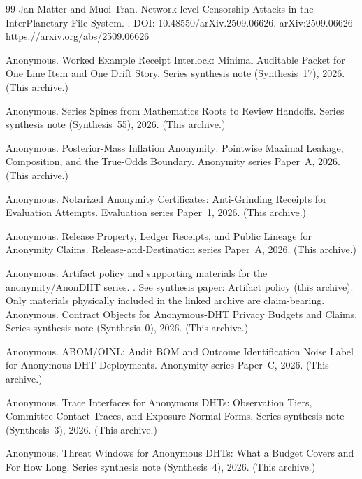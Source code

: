 \documentclass[11pt]{article}
\begin{document}
\begin{thebibliography}{99}
Jan Matter and Muoi Tran.
\newblock Network-level Censorship Attacks in the {I}nter{P}lanetary {F}ile {S}ystem.
.
\newblock DOI: 10.48550/arXiv.2509.06626.
\newblock arXiv:2509.06626
\newblock \url{https://arxiv.org/abs/2509.06626}


Anonymous.
\newblock Worked Example Receipt Interlock: Minimal Auditable Packet for One Line Item and One Drift Story.
\newblock Series synthesis note (Synthesis~17), 2026. (This archive.)

Anonymous.
\newblock Series Spines from Mathematics Roots to Review Handoffs.
\newblock Series synthesis note (Synthesis~55), 2026. (This archive.)

Anonymous.
\newblock Posterior-Mass Inflation Anonymity: Pointwise Maximal Leakage, Composition, and the True-Odds Boundary.
\newblock Anonymity series Paper~A, 2026. (This archive.)

Anonymous.
\newblock Notarized Anonymity Certificates: Anti-Grinding Receipts for Evaluation Attempts.
\newblock Evaluation series Paper~1, 2026. (This archive.)

Anonymous.
\newblock Release Property, Ledger Receipts, and Public Lineage for Anonymity Claims.
\newblock Release-and-Destination series Paper~A, 2026. (This archive.)

Anonymous.
\newblock Artifact policy and supporting materials for the anonymity/AnonDHT series.
.
\newblock See synthesis paper: Artifact policy (this archive). Only materials physically included in the linked archive are claim-bearing.
Anonymous.
\newblock Contract Objects for Anonymous-DHT Privacy Budgets and Claims.
\newblock Series synthesis note (Synthesis~0), 2026. (This archive.)

Anonymous.
\newblock ABOM/OINL: Audit BOM and Outcome Identification Noise Label for Anonymous DHT Deployments.
\newblock Anonymity series Paper~C, 2026. (This archive.)

Anonymous.
\newblock Trace Interfaces for Anonymous {DHT}s: Observation Tiers, Committee-Contact Traces, and Exposure Normal Forms.
\newblock Series synthesis note (Synthesis~3), 2026. (This archive.)

Anonymous.
\newblock Threat Windows for Anonymous {DHT}s: What a Budget Covers and For How Long.
\newblock Series synthesis note (Synthesis~4), 2026. (This archive.)



\end{thebibliography}
\end{document}
